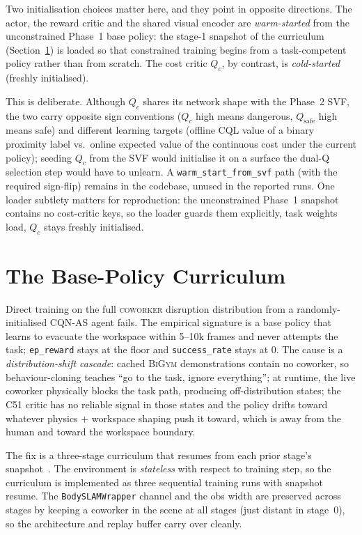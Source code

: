 \documentclass[11pt,a4paper]{report}
\newcommand{\bigym}{\textsc{BiGym}}
\newcommand{\cqnas}{CQN-AS}
\newcommand{\coworker}{\textsc{coworker}}
\begin{document}
Two initialisation choices matter here, and they point in opposite
directions. The actor, the reward critic and the shared visual encoder
are \emph{warm-started} from the unconstrained Phase~1 base policy: the
stage-1 snapshot of the curriculum
(Section~\ref{sec:method:curriculum}) is loaded so that constrained
training begins from a task-competent policy rather than from scratch.
The cost critic $Q_c$, by contrast, is \emph{cold-started} (freshly
initialised).

This is deliberate. Although $Q_c$ shares its network shape with the
Phase~2 SVF, the two carry opposite sign conventions ($Q_c$ high
means dangerous, $Q_{\mathrm{safe}}$ high means safe) and different
learning targets (offline CQL value of a binary proximity label vs.\
online expected value of the continuous cost under the current
policy); seeding $Q_c$ from the SVF would initialise it on a surface
the dual-Q selection step would have to unlearn. A
\texttt{warm\_start\_from\_svf} path (with the required sign-flip)
remains in the codebase, unused in the reported runs. One loader
subtlety matters for reproduction: the unconstrained Phase~1
snapshot contains no cost-critic keys, so the loader guards them
explicitly, task weights load, $Q_c$ stays freshly initialised.


\section{The Base-Policy Curriculum}
\label{sec:method:curriculum}

Direct training on the full \coworker{} disruption distribution
from a randomly-initialised \cqnas{} agent fails. The empirical
signature is a base policy that learns to evacuate the workspace
within 5--10k frames and never attempts the task;
\texttt{ep\_reward} stays at the floor and \texttt{success\_rate}
stays at 0. The cause is a \emph{distribution-shift cascade}:
cached \bigym{} demonstrations contain no coworker, so
behaviour-cloning teaches ``go to the task, ignore everything''; at
runtime, the live coworker physically blocks the task path,
producing off-distribution states; the C51 critic has no reliable
signal in those states and the policy drifts toward whatever
physics + workspace shaping push it toward, which is away from the
human and toward the workspace boundary.

The fix is a three-stage curriculum that resumes from each prior
stage's snapshot~\cite{narvekar2020curriculum}. The environment is
\emph{stateless} with respect to training step, so the curriculum
is implemented as three sequential training runs with snapshot
resume. The \texttt{BodySLAMWrapper} channel and the obs width are
preserved across stages by keeping a coworker in the scene at all
stages (just distant in stage~0), so the architecture and replay
buffer carry over cleanly.
\end{document}

